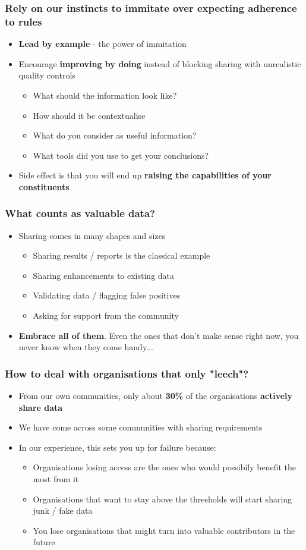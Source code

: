 \begin{frame}
\frametitle{Rely on our instincts to immitate over expecting adherence to rules}
\begin{itemize}
    \item {\bf Lead by example} - the power of immitation
    \item Encourage {\bf improving by doing} instead of blocking sharing with unrealistic quality controls
	\begin{itemize}
		\item What should the information look like?
		\item How should it be contextualise
		\item What do you consider as useful information?
		\item What tools did you use to get your conclusions?
	\end{itemize}
\item Side effect is that you will end up {\bf raising the capabilities of your constituents}
\end{itemize}
\end{frame}

\begin{frame}
\frametitle{What counts as valuable data?}
\begin{itemize}
	\item Sharing comes in many shapes and sizes
	\begin{itemize}
		\item Sharing results / reports is the classical example
		\item Sharing enhancements to existing data
		\item Validating data / flagging false positives
		\item Asking for support from the community
	\end{itemize}
\item {\bf Embrace all of them}. Even the ones that don't make sense right now, you never know when they come handy...
\end{itemize}
\end{frame}

\begin{frame}
\frametitle{How to deal with organisations that only "leech"?}
\begin{itemize}
    \item From our own communities, only about {\bf 30\%} of the organisations {\bf actively share data}
	\item We have come across some communities with sharing requirements
	\item In our experience, this sets you up for failure because:
	\begin{itemize}
		\item Organisations losing access are the ones who would possibily benefit the most from it
		\item Organisations that want to stay above the thresholds will start sharing junk / fake data
		\item You lose organisations that might turn into valuable contributors in the future
	\end{itemize}
\end{itemize}
\end{frame}

